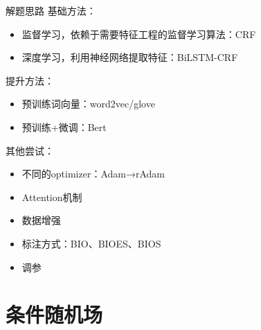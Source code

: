 \documentclass[9pt,aspectratio=169]{ctexbeamer}
\begin{document}
	\begin{frame}{解题思路}
		基础方法：
		\begin{itemize}
			\item 监督学习，依赖于需要特征工程的监督学习算法：CRF
			\item 深度学习，利用神经网络提取特征：BiLSTM-CRF
		\end{itemize}
		提升方法：
		\begin{itemize}
			\item 预训练词向量：word2vec/glove
			\item 预训练+微调：Bert
		\end{itemize}
		其他尝试：
		\begin{itemize}
			\item 不同的optimizer：Adam→rAdam
			\item Attention机制
			\item 数据增强
			\item 标注方式：BIO、BIOES、BIOS
			\item 调参
		\end{itemize}
		
		
		
		
		
	\end{frame}
	
	\section{条件随机场}
\end{document}
